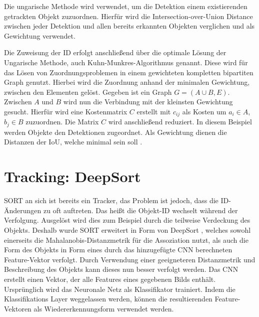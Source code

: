 \documentclass[conference]{IEEEtran}
\begin{document}
	Die ungarische Methode wird verwendet, um die Detektion einem existierenden getrackten Objekt zuzuordnen. Hierfür wird die Intersection-over-Union Distance zwischen jeder Detektion und allen bereits erkannten Objekten verglichen und als Gewichtung verwendet.
	
	Die Zuweisung der ID erfolgt anschließend über die optimale Lösung der Ungarische Methode, auch Kuhn-Munkres-Algorithmus genannt. Diese wird für das Lösen von Zuordnungsproblemen in einem gewichteten kompletten bipartiten Graph genutzt. Hierbei wird die Zuordnung anhand der minimalen Gewichtung, zwischen den Elementen gelöst. Gegeben ist ein Graph $G = (A \cup B, E) $. Zwischen $A$ und $B$ wird nun die Verbindung mit der kleinsten Gewichtung gesucht. Hierfür wird eine Kostenmatrix $C$ erstellt mit $c_{ij}$ als Kosten um $a_i \in A$, $b_j \in B$ zuzuordnen. Die Matrix $C$ wird anschließend reduziert. In diesem Beispiel werden Objekte den Detektionen zugeordnet. Als Gewichtung dienen die Distanzen der IoU, welche minimal sein soll \cite{hungarian}.
	 
	\section{Tracking: DeepSort}
	
	SORT an sich ist bereits ein Tracker, das Problem ist jedoch, dass die ID-Änderungen zu oft auftreten. Das heißt die Objekt-ID wechselt während der Verfolgung. Ausgelöst wird dies zum Beispiel durch die teilweise Verdeckung des Objekts. Deshalb wurde SORT erweitert in Form von DeepSort \cite{deepSort}, welches sowohl einerseits die Mahalanobis-Distanzmetrik für die Assoziation nutzt, als auch die Form des Objekts in Form eines durch das hinzugefügte CNN berechneten Feature-Vektor verfolgt. Durch Verwendung einer geeigneteren Distanzmetrik und Beschreibung des Objekts kann dieses nun besser verfolgt werden.
	Das CNN erstellt einen Vektor, der alle Features eines gegebenen Bilds enthält. Ursprünglich wird das Neuronale Netz als Klassifikator trainiert. Indem die Klassifikations Layer weggelassen werden, können die resultierenden Feature-Vektoren als Wiedererkennungsform verwendet werden.
	
\end{document}

